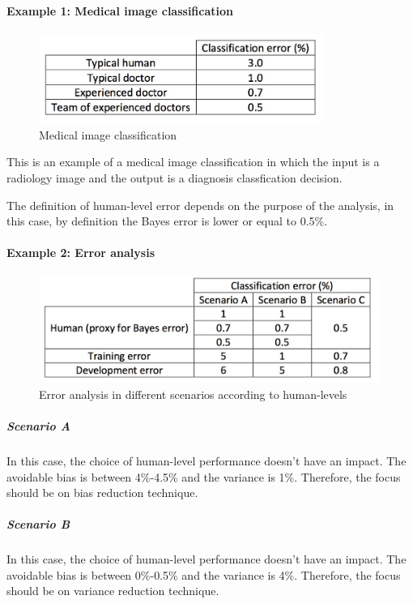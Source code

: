 \documentclass[UTF8]{article}
\begin{document}
\paragraph{Example 1: Medical image classification}
\begin{figure}[htb]
    \centering
    \includegraphics[width=25em]{figures/medical-image-classification}
    \caption{Medical image classification}
    \label{fig:medical-image-classification}
\end{figure}

This is an example of a medical image classification in which the input is a radiology image and
the output is a diagnosis classfication decision.

The definition of human-level error depends on the purpose of the analysis, in this case,
by definition the Bayes error is lower or equal to 0.5\%.

\paragraph{Example 2: Error analysis}

\begin{figure}[htb]
    \centering
    \includegraphics[width=30em]{figures/error-analysis}
    \caption{Error analysis in different scenarios according to human-levels}
    \label{fig:error-analysis}
\end{figure}

\subparagraph{Scenario A}
In this case, the choice of human-level performance doesn't have an impact. The avoidable bias is
between 4\%-4.5\% and the variance is 1\%. Therefore, the focus should be on bias reduction
technique.

\subparagraph{Scenario B}
In this case, the choice of human-level performance doesn't have an impact. The avoidable bias is
between 0\%-0.5\% and the variance is 4\%. Therefore, the focus should be on variance reduction
technique.
\end{document}
